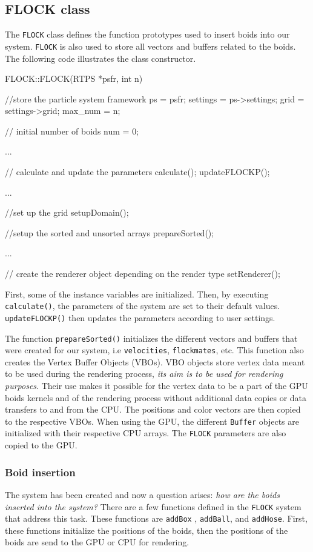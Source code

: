 \subsection{FLOCK class}
The \texttt{FLOCK} class defines the function prototypes used to insert boids into our system. \texttt{FLOCK} is also used to store all vectors and buffers related to the boids. The following code illustrates the class constructor. 

\begin{cppcode}{0}
FLOCK::FLOCK(RTPS *psfr, int n)
 {
 	//store the particle system framework
 	ps = psfr;
	settings = ps->settings;
	grid = settings->grid;
	max_num = n;
	
	// initial number of boids
	num = 0;
 	
	...
 
 	// calculate and update the parameters
	calculate();
	updateFLOCKP();

	...

	//set up the grid
	setupDomain();
	
	//setup the sorted and unsorted arrays
	prepareSorted();
 	 
	 ...
		
	// create the renderer object depending on the render type		
	setRenderer(); 
}
\end{cppcode}

First, some of the instance variables are initialized. Then, by executing \texttt{calculate()}, the parameters of the system are set to their default values. \texttt{updateFLOCKP()} then updates the parameters according to user settings.

The function \texttt{prepareSorted()} initializes the different vectors and buffers that were created for our system, i.e \texttt{velocities}, \texttt{flockmates}, etc. This function also creates the Vertex Buffer Objects (VBOs). VBO objects store vertex data meant to be used during the rendering process, {\em its aim is to be used for rendering purposes}\cite{vbo}. Their use makes it possible for the vertex data to be a part of the GPU boids kernels and of the rendering process without additional data copies or data transfers to and from the CPU. The positions and color vectors are then copied to the respective VBOs. When using the GPU, the different \texttt{Buffer} objects are initialized with their respective CPU arrays. The \texttt{FLOCK} parameters are also copied to the GPU. 

\subsubsection{Boid insertion}
The system has been created and now a question arises: \textit{how are the boids inserted into the system?} There are a few functions defined in the \texttt{FLOCK} system that address this task. These functions are \texttt{addBox} , \texttt{addBall}, and \texttt{addHose}. First, these functions initialize the positions of the boids, then the positions of the boids are send to the GPU or CPU for rendering. 

